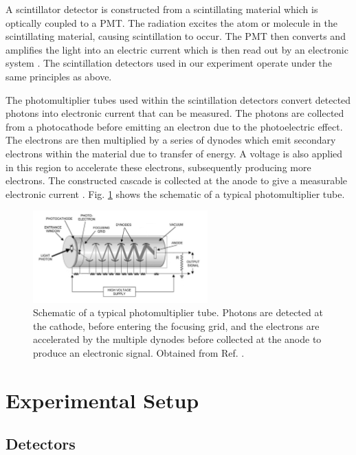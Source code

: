 \documentclass[a4paper]{report}
\numberwithin{equation}{section}
\begin{document}
A scintillator detector is constructed from a scintillating material which is optically coupled to a PMT. The radiation excites the 
atom or molecule in the scintillating material, causing scintillation to occur. The PMT then converts and amplifies the light into 
an electric current which is then read out by an electronic system \cite{Leo1994}. The scintillation detectors used in our experiment 
operate under the same principles as above. \par 


The photomultiplier tubes used within the scintillation detectors convert detected photons into electronic current that can 
be measured. The photons are collected from a photocathode before emitting an electron due to the photoelectric effect. The electrons 
are then multiplied by a series of dynodes which emit secondary electrons within the material due to transfer of energy. A voltage is also applied in this region to accelerate these electrons, subsequently producing more electrons. The constructed cascade is 
collected at the anode to give a measurable electronic current \cite{Leo1994}. Fig. \ref{fig:pmt_schematic} shows the schematic of a typical photomultiplier tube. 


\begin{figure}[!h]
	\centering
	\includegraphics[width=0.6\textwidth]{pmt_schematic.png}
	\caption{Schematic of a typical photomultiplier tube. Photons are detected at the cathode, before entering the focusing grid,
	 and the electrons are accelerated by the multiple dynodes before collected at the anode to produce an electronic signal.
	 Obtained from Ref. \cite{Danisch2014}.}
	\label{fig:pmt_schematic}	
\end{figure}


\chapter{Experimental Setup} \label{chap:exp_setup}

\section{Detectors}
\end{document}

